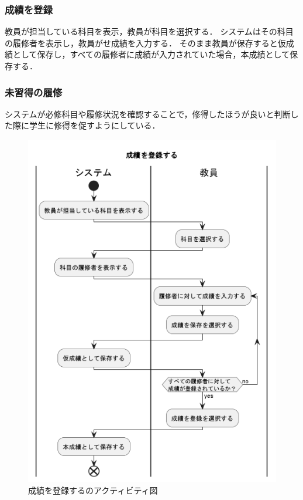 \documentclass[documentclass]{jsarticle}
\begin{document}
\subsubsection*{成績を登録}
教員が担当している科目を表示，教員が科目を選択する．
システムはその科目の履修者を表示し，教員がせ成績を入力する．
そのまま教員が保存すると仮成績として保存し，すべての履修者に成績が入力されていた場合，本成績として保存する．

\subsubsection*{未習得の履修}
システムが必修科目や履修状況を確認することで，修得したほうが良いと判断した際に学生に修得を促すようにしている．


\begin{figure}[H]
  \centering
  \begin{minipage}[b]{0.49\columnwidth}
      \centering
      \includegraphics[width=0.9\columnwidth]{figure/7-5.png}
      \caption{成績を登録するのアクティビティ図}
      \label{fig:7-5}
  \end{minipage}

\end{figure}
\end{document}
